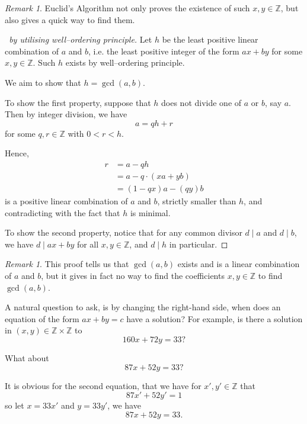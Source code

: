 \documentclass{article}
\theoremstyle{definition}
\theoremstyle{remark}
\newtheorem{remark}[theorem]{Remark}
\newcommand{\pqty}[1]{\left(#1\right)}
\newcommand{\divides}{\mid}
\newcommand{\ZZ}{\mathbb{Z}}
\begin{document}
\begin{remark}
    Euclid's Algorithm not only proves the existence of such \(x, y \in \ZZ\), but also gives a quick way to find them.
\end{remark}

\begin{proof}[\proofname\ by utilising well--ordering principle]
    Let \(h\) be the least positive linear combination of \(a\) and \(b\), i.e. the least positive integer of the form \(ax + by\) for some \(x, y \in \ZZ\). Such \(h\) exists by well--ordering principle.

    We aim to show that \(h = \gcd\pqty{a, b}\).

    To show the first property, suppose that \(h\) does not divide one of \(a\) or \(b\), say \(a\). Then by integer division, we have
    \[
        a = qh + r
    \]
    for some \(q, r \in \ZZ\) with \(0 < r < h\).

    Hence,
    \begin{align*}
        r &= a - qh \\
        &= a - q \cdot \pqty{xa + yb} \\
        &= \pqty{1 - qx} a - \pqty{qy} b
    \end{align*}
    is a positive linear combination of \(a\) and \(b\), strictly smaller than \(h\), and contradicting with the fact that \(h\) is minimal.

    To show the second property, notice that for any common divisor \(d \divides a\) and \(d \divides b\), we have \(d \divides ax + by\) for all \(x, y \in \ZZ\), and \(d \divides h\) in particular.
\end{proof}

\begin{remark}
    This proof tells us that \(\gcd\pqty{a, b}\) exists and is a linear combination of \(a\) and \(b\), but it gives in fact no way to find the coefficients \(x, y \in \ZZ\) to find \(\gcd\pqty{a, b}\).
\end{remark}

A natural question to ask, is by changing the right-hand side, when does an equation of the form \(ax + by = c\) have a solution? For example, is there a solution in \(\pqty{x, y} \in \ZZ \times \ZZ\) to
\[
    160 x + 72 y = 33?
\]

What about
\[
    87 x + 52 y = 33?
\]

It is obvious for the second equation, that we have for \(x', y' \in \ZZ\) that
\[
    87 x' + 52 y' = 1
\]
so let \(x = 33 x'\) and \(y = 33 y'\), we have
\[
    87 x + 52 y = 33.
\]
\end{document}
